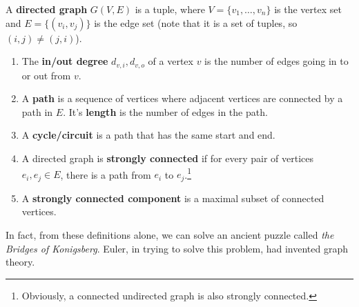   \begin{definition}
    A \textbf{directed graph} $G(V, E)$ is a tuple, where $V = \{v_1, \ldots, v_n\}$ is the vertex set and $E = \{(v_i, v_j)\}$ is the edge set (note that it is a set of tuples, so $(i, j) \neq ( j, i)$).
    \begin{enumerate}
      \item The \textbf{in/out degree} $d_{v, i}, d_{v, o}$ of a vertex $v$ is the number of edges going in to or out from $v$. 
      \item A \textbf{path} is a sequence of vertices where adjacent vertices are connected by a path in $E$. It's \textbf{length} is the number of edges in the path. 
      \item A \textbf{cycle/circuit} is a path that has the same start and end. 
      \item A directed graph is \textbf{strongly connected} if for every pair of vertices $e_i, e_j \in E$, there is a path from $e_i$ to $e_j$.\footnote{Obviously, a connected undirected graph is also strongly connected.}
      \item A \textbf{strongly connected component} is a maximal subset of connected vertices. 
    \end{enumerate}
  \end{definition}

  In fact, from these definitions alone, we can solve an ancient puzzle called \textit{the Bridges of Konigsberg}. Euler, in trying to solve this problem, had invented graph theory. 

